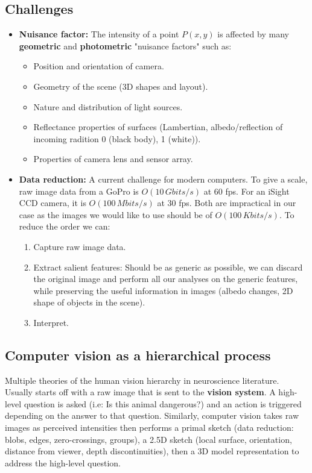 \documentclass[a4paper,11pt]{article}
\begin{document}
\subsection{Challenges}
\begin{itemize}
	\item \textbf{Nuisance factor:} The intensity of a point $P(x,y)$ is affected by many \textbf{geometric} and \textbf{photometric} "nuisance factors" such as:
	\begin{itemize}
		\item Position and orientation of camera.
		\item Geometry of the scene (3D shapes and layout).
		\item Nature and distribution of light sources.
		\item Reflectance properties of surfaces (Lambertian, albedo/reflection of incoming radition 0 (black body), 1 (white)).
		\item Properties of camera lens and sensor array.
	\end{itemize}

	\item \textbf{Data reduction:} A current challenge for modern computers. To give a scale, raw image data from a GoPro is $O(10\, Gbits/s)$ at 60 fps. For an iSight CCD camera, it is $O(100\, Mbits/s)$ at 30 fps. Both are impractical in our case as the images we would like to use should be of $O(100\, Kbits/s)$. To reduce the order we can:
	\begin{enumerate}
		\item Capture raw image data.
		\item Extract salient features: Should be as generic as possible, we can discard the original image and perform all our analyses on the generic features, while preserving the useful information in images (albedo changes, 2D shape of objects in the scene).
		\item Interpret.
	\end{enumerate}
\end{itemize}
\subsection{Computer vision as a hierarchical process}
Multiple theories of the human vision hierarchy in neuroscience literature. Usually starts off with a raw image that is sent to the \textbf{vision system}. A high-level question is asked (i.e: Is this animal dangerous?) and an action is triggered depending on the answer to that question. Similarly, computer vision takes raw images as perceived intensities then performs a primal sketch (data reduction: blobs, edges, zero-crossings, groups), a 2.5D sketch (local surface, orientation, distance from viewer, depth discontinuities), then a 3D model representation to address the high-level question. 
\end{document}
